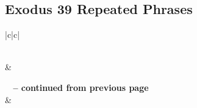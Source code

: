 \subsection{Exodus 39 Repeated Phrases}


\normalsize
 
\begin{center}
\begin{longtable}{|c|c|}
\caption[Exodus 39 Repeated Phrases]{Exodus 39 Repeated Phrases}\label{table:Repeated Phrases Exodus 39} \\
\hline {} &  \\ \hline 
\endfirsthead
 
{{\bfseries \tablename\ \thetable{} -- continued from previous page}} \\  
\hline {} &  \\ \hline 
\endhead
 

\end{longtable}
\end{center}
